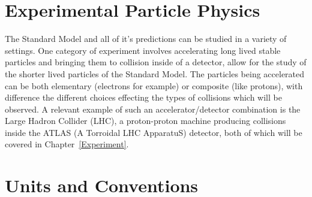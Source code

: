 \section{Experimental Particle Physics}
\label{Sec:Experi}
The Standard Model and all of it's predictions can be studied in a variety of settings.  
One category of experiment involves accelerating long lived stable particles and bringing them to collision inside of a detector, allow for the study of the shorter lived particles of the Standard Model.  
The particles being accelerated can be both elementary (electrons for example) or composite (like protons), with difference the different choices effecting the types of collisions which will be observed.  
A relevant example of such an accelerator/detector combination is the Large Hadron Collider (LHC), a proton-proton machine producing collisions inside the ATLAS (A Torroidal LHC ApparatuS) detector, both of which will be covered in Chapter~\ref{Experiment}.  \\

\section{Units and Conventions}
 






